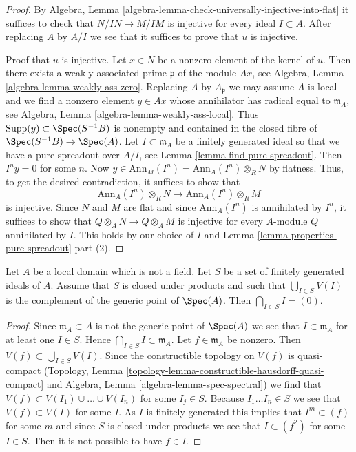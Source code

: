 \begin{proof}
By Algebra, Lemma \ref{algebra-lemma-check-universally-injective-into-flat}
it suffices to check that $N/IN \to M/IM$ is injective for every
ideal $I \subset A$. After replacing $A$ by $A/I$ we see that it suffices
to prove that $u$ is injective.

\medskip\noindent
Proof that $u$ is injective. Let $x \in N$ be a nonzero element of the
kernel of $u$. Then there exists a weakly associated prime $\mathfrak p$
of the module $Ax$, see Algebra, Lemma \ref{algebra-lemma-weakly-ass-zero}.
Replacing $A$ by $A_\mathfrak p$ we may assume $A$ is local and
we find a nonzero element $y \in Ax$ whose annihilator has radical
equal to $\mathfrak m_A$, see
Algebra, Lemma \ref{algebra-lemma-weakly-ass-local}.
Thus $\text{Supp}(y) \subset \Spec(S^{-1}B)$ is nonempty and
contained in the closed fibre of $\Spec(S^{-1}B) \to \Spec(A)$.
Let $I \subset \mathfrak m_A$ be a
finitely generated ideal so that we have a pure spreadout over $A/I$, see
Lemma \ref{lemma-find-pure-spreadout}. Then $I^n y = 0$ for some $n$. Now
$y \in \text{Ann}_M(I^n) = \text{Ann}_A(I^n) \otimes_R N$ by flatness.
Thus, to get the desired contradiction, it suffices to show that
$$
\text{Ann}_A(I^n) \otimes_R N
\longrightarrow
\text{Ann}_A(I^n) \otimes_R M
$$
is injective. Since $N$ and $M$ are flat and since $\text{Ann}_A(I^n)$
is annihilated by $I^n$, it suffices to show that
$Q \otimes_A N \to Q \otimes_A M$ is injective for every $A$-module
$Q$ annihilated by $I$. This holds by our choice of $I$ and
Lemma \ref{lemma-properties-pure-spreadout} part (2).
\end{proof}

\begin{lemma}
\label{lemma-big-intersection-is-zero}
Let $A$ be a local domain which is not a field.
Let $S$ be a set of finitely generated ideals of $A$.
Assume that $S$ is closed under products and such that
$\bigcup_{I \in S} V(I)$ is the complement of the generic point of $\Spec(A)$.
Then $\bigcap_{I \in S} I = (0)$.
\end{lemma}

\begin{proof}
Since $\mathfrak m_A \subset A$ is not the generic point of $\Spec(A)$
we see that $I \subset \mathfrak m_A$ for at least one $I \in S$.
Hence $\bigcap_{I \in S} I \subset \mathfrak m_A$.
Let $f \in \mathfrak m_A$ be nonzero. Then
$V(f) \subset \bigcup_{I \in S} V(I)$.
Since the constructible topology on $V(f)$ is quasi-compact
(Topology, Lemma \ref{topology-lemma-constructible-hausdorff-quasi-compact}
and
Algebra, Lemma \ref{algebra-lemma-spec-spectral})
we find that $V(f) \subset V(I_1) \cup \ldots \cup V(I_n)$
for some $I_j \in S$. Because $I_1 \ldots I_n \in S$ we see that
$V(f) \subset V(I)$ for some $I$. As $I$ is finitely generated
this implies that $I^m \subset (f)$ for some $m$ and since
$S$ is closed under products we see that $I \subset (f^2)$ for
some $I \in S$. Then it is not possible to have $f \in I$.
\end{proof}

